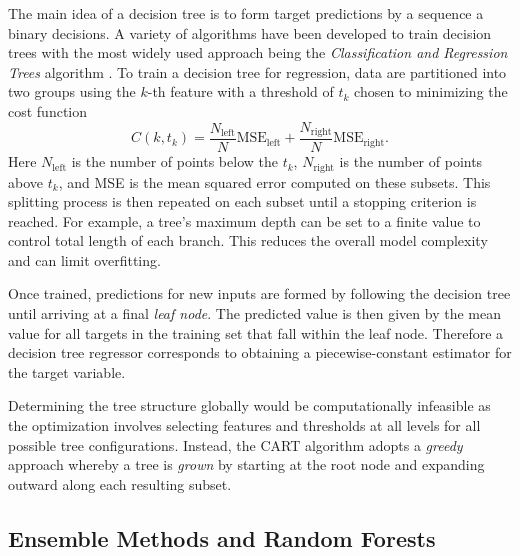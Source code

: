 The main idea of a decision tree is to form target predictions by a sequence a
binary decisions. A variety of algorithms have been developed to train decision
trees with the most widely used approach being the \textit{Classification and
  Regression Trees} algorithm \cite{decision-trees}. To train a decision tree
for regression, data are partitioned into two groups using the $k$-th feature
with a threshold of $t_k$ chosen to minimizing the cost function
  \begin{equation}
    C(k, t_k) = \frac{N_{\text{left}}}{N}\text{MSE}_{\text{left}} + \frac{N_{\text{right}}}{N}\text{MSE}_{\text{right}}.
  \end{equation}
Here $N_{\text{left}}$ is the number of points below the $t_k$,
$N_{\text{right}}$ is the number of points above $t_k$, and  MSE is the mean
squared error computed on these subsets. This splitting process is then repeated
on each subset until a stopping criterion is reached. For example, a tree's
maximum depth can be set to a finite value to control total length of each
branch. This reduces the overall model complexity and can limit overfitting.

Once trained, predictions for new inputs are formed by following the decision tree
until arriving at a final \textit{leaf node}. The predicted value is then given
by the mean value for all targets in the training set that fall within the leaf
node. Therefore a decision tree regressor corresponds to obtaining a
piecewise-constant estimator for the target variable.

Determining the tree structure globally would be computationally infeasible as
the optimization involves selecting features and thresholds at all levels for
all possible tree configurations. Instead, the CART algorithm adopts a
\textit{greedy} approach whereby a tree is \textit{grown} by starting at the
root node and expanding outward along each resulting subset.

\subsection{Ensemble Methods and Random Forests}

